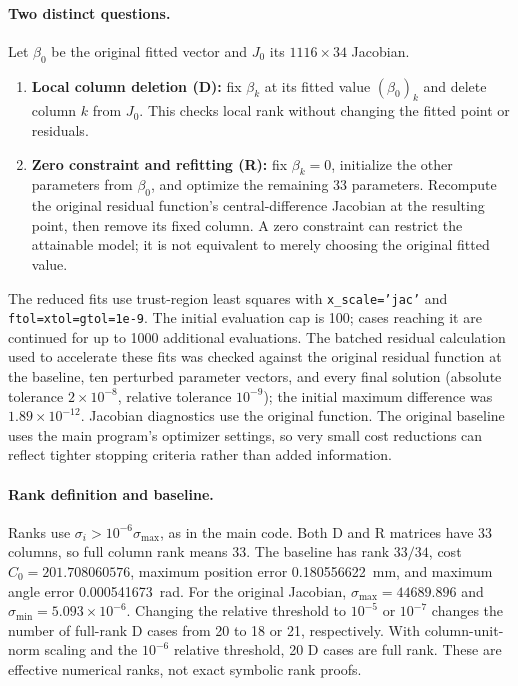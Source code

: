 \documentclass[11pt]{article}
\begin{document}
\paragraph{Two distinct questions.}
Let $\beta_0$ be the original fitted vector and $J_0$ its $1116\times34$ Jacobian.
\begin{enumerate}
\item \textbf{Local column deletion (D):} fix $\beta_k$ at its fitted value $(\beta_0)_k$ and delete column $k$ from $J_0$. This checks local rank without changing the fitted point or residuals.
\item \textbf{Zero constraint and refitting (R):} fix $\beta_k=0$, initialize the other parameters from $\beta_0$, and optimize the remaining 33 parameters. Recompute the original residual function's central-difference Jacobian at the resulting point, then remove its fixed column. A zero constraint can restrict the attainable model; it is not equivalent to merely choosing the original fitted value.
\end{enumerate}
The reduced fits use trust-region least squares with \texttt{x\_scale='jac'} and \texttt{ftol=xtol=gtol=1e-9}. The initial evaluation cap is 100; cases reaching it are continued for up to 1000 additional evaluations. The batched residual calculation used to accelerate these fits was checked against the original residual function at the baseline, ten perturbed parameter vectors, and every final solution (absolute tolerance $2\times10^{-8}$, relative tolerance $10^{-9}$); the initial maximum difference was $1.89\times10^{-12}$. Jacobian diagnostics use the original function. The original baseline uses the main program's optimizer settings, so very small cost reductions can reflect tighter stopping criteria rather than added information.

\paragraph{Rank definition and baseline.}
Ranks use $\sigma_i>10^{-6}\sigma_{\max}$, as in the main code. Both D and R matrices have 33 columns, so full column rank means 33. The baseline has rank $33/34$, cost $C_0=201.708060576$, maximum position error 0.180556622~mm, and maximum angle error 0.000541673~rad. For the original Jacobian, $\sigma_{\max}=44689.896$ and $\sigma_{\min}=5.093\times10^{-6}$. Changing the relative threshold to $10^{-5}$ or $10^{-7}$ changes the number of full-rank D cases from 20 to 18 or 21, respectively. With column-unit-norm scaling and the $10^{-6}$ relative threshold, 20 D cases are full rank. These are effective numerical ranks, not exact symbolic rank proofs.
\end{document}
